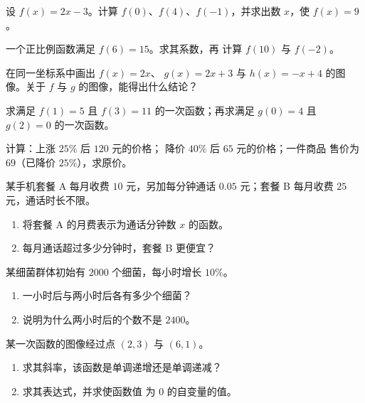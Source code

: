 \begin{exercise}[$\star$]\label{exo:g9:linfunc:2}
设 $f(x) = 2x - 3$。计算 $f(0)$、$f(4)$、$f(-1)$，并求出数
$x$，使 $f(x) = 9$。
\end{exercise}

\begin{exercise}[$\star$]\label{exo:g9:linfunc:3}
一个正比例函数满足 $f(6) = 15$。求其系数，再
计算 $f(10)$ 与 $f(-2)$。
\end{exercise}

\begin{exercise}[$\star$]\label{exo:g9:linfunc:4}
在同一坐标系中画出 $f(x) = 2x$、
$g(x) = 2x + 3$ 与 $h(x) = -x + 4$ 的图像。关于
$f$ 与 $g$ 的图像，能得出什么结论？
\end{exercise}

\begin{exercise}[$\star$]\label{exo:g9:linfunc:5}
求满足 $f(1) = 5$ 且 $f(3) = 11$ 的一次函数；再求满足
$g(0) = 4$ 且 $g(2) = 0$ 的一次函数。
\end{exercise}

\begin{exercise}[$\star\star$]\label{exo:g9:linfunc:6}
计算：上涨 $25\%$ 后 $120$ 元的价格；
降价 $40\%$ 后 $65$ 元的价格；一件商品
售价为 $69$（已降价 $25\%$），求原价。
\end{exercise}

\begin{exercise}[$\star\star$]\label{exo:g9:linfunc:7}
某手机套餐 A 每月收费 $10$ 元，另加每分钟通话 $0.05$ 元；套餐
B 每月收费 $25$ 元，通话时长不限。
\begin{enumerate}
  \item 将套餐 A 的月费表示为通话分钟数
        $x$ 的函数。
  \item 每月通话超过多少分钟时，套餐 B 更便宜？
\end{enumerate}
\end{exercise}

\begin{exercise}[$\star\star$]\label{exo:g9:linfunc:8}
某细菌群体初始有 $2000$ 个细菌，每小时增长 $10\%$。
\begin{enumerate}
  \item 一小时后与两小时后各有多少个细菌？
  \item 说明为什么两小时后的个数不是 $2400$。
\end{enumerate}
\end{exercise}

\begin{exercise}[$\star\star$]\label{exo:g9:linfunc:9}
某一次函数的图像经过点 $(2, 3)$ 与
$(6, 1)$。
\begin{enumerate}
  \item 求其斜率，该函数是单调递增还是单调递减？
  \item 求其表达式，并求使函数值
        为 $0$ 的自变量的值。
\end{enumerate}
\end{exercise}

